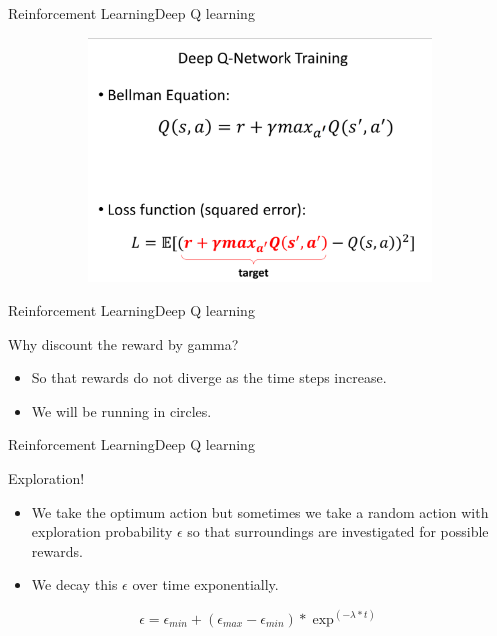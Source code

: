 \documentclass[10pt]{beamer}
\begin{document}
\begin{frame}{Reinforcement Learning}{Deep Q learning}
\begin{figure}[!htb]
\centering
\begin{subfigure}[t]{0.5\linewidth}
\includegraphics[width=1.5\textwidth]{assets/bellman_equation.png}
\end{subfigure}
\vspace{0.1in}
\label{fig:tripEmb}
\end{figure}
\end{frame}



\begin{frame}{Reinforcement Learning}{Deep Q learning}

\item Why discount the reward by gamma?
\pause
\begin{itemize}
\item So that rewards do not diverge as the time steps increase.
\end{itemize}
\pause
\begin{itemize}
\item We will be running in circles.
\end{itemize}

\end{frame}

\begin{frame}{Reinforcement Learning}{Deep Q learning}
\item Exploration!

\begin{itemize}
\item We take the optimum action but sometimes we take a random action with exploration probability $\epsilon$ so that surroundings are investigated for possible rewards.
\item We decay this $\epsilon$ over time exponentially.
\end{itemize}
\item $$ \epsilon = \epsilon_{min} + (\epsilon_{max} - \epsilon_{min}) * \exp^{(-\lambda * t)}  $$

\end{frame}
\end{document}

